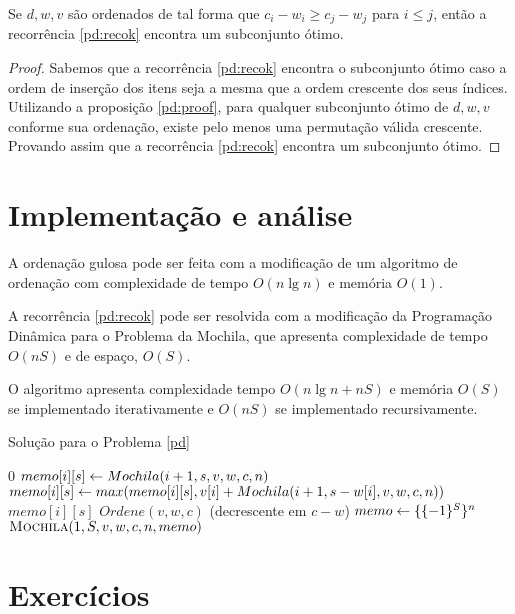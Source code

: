 \begin{lema} \label{pd:impl}
  Se $d, w, v$ são ordenados de tal forma que $c_{i} - w_{i} \geq c_{j} - w_{j}$ para $i \leq j$, então a recorrência \ref{pd:recok} encontra um subconjunto ótimo.
\end{lema}
\begin{proof}
  Sabemos que a recorrência \ref{pd:recok} encontra o subconjunto ótimo caso a ordem de inserção dos itens seja a mesma que a ordem crescente dos seus índices.
  Utilizando a proposição \ref{pd:proof}, para qualquer subconjunto ótimo de $d, w, v$ conforme sua ordenação, existe pelo menos uma permutação válida crescente.
  Provando assim que a recorrência \ref{pd:recok} encontra um subconjunto ótimo.
\end{proof}

\section{Implementação e análise}

A ordenação gulosa pode ser feita com a modificação de um algoritmo de ordenação com complexidade de tempo $O(n \lg n)$ e memória $O(1)$.

A recorrência \ref{pd:recok} pode ser resolvida com a modificação da Programação Dinâmica para o Problema da Mochila, que apresenta complexidade de tempo $O(nS)$ e de espaço, $O(S)$.

O algoritmo apresenta complexidade tempo $O(n \lg n + nS)$ e memória $O(S)$ se implementado iterativamente e $O(nS)$ se implementado recursivamente.

\begin{algorithm}[H]
\caption{Solução para o Problema \ref{pd}}
\label{pd:code}
\begin{algorithmic}[1]
    \State \Return $0$
  \EndIf
    \State $memo[i][s] \leftarrow Mochila(i + 1, s, v, w, c, n)$
      \State $memo[i][s] \leftarrow max(memo[i][s], v[i] + Mochila(i + 1, s - w[i], v, w, c, n))$
    \EndIf
  \EndIf
  \State \Return $memo[i][s]$
\EndFunction
{}
    \State $Ordene(v, w, c)$ (decrescente em $c - w$) 
    \State $memo \leftarrow \{\{-1\}^S\}^n$
    \State \Return $\textsc{Mochila}(1, S, v, w, c, n, memo)$
\EndFunction
\end{algorithmic}
\end{algorithm}

\section{Exercícios}

